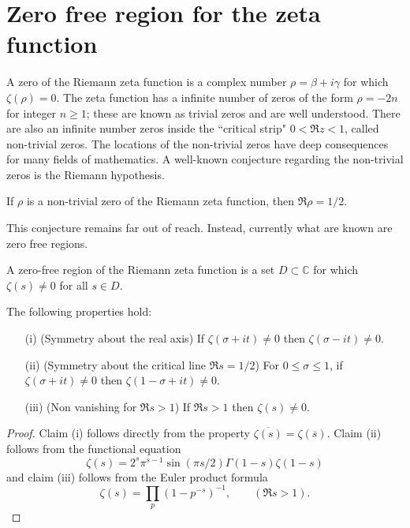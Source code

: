 \chapter{Zero free region for the zeta function}\label{zerofree-chapter}

\unintegrated 

A zero of the Riemann zeta function is a complex number $\rho = \beta + i\gamma$ for which $\zeta(\rho) = 0$. The zeta function has a infinite number of zeros of the form $\rho = -2n$ for integer $n \ge 1$; these are known as trivial zeros and are well understood. There are also an infinite number zeros inside the ``critical strip" $0 < \Re z < 1$, called non-trivial zeros. The locations of the non-trivial zeros have deep consequences for many fields of mathematics. A well-known conjecture regarding the non-trivial zeros is the Riemann hypothesis. 

\begin{conjecture}\label{rh}
If $\rho$ is a non-trivial zero of the Riemann zeta function, then $\Re \rho = 1/2$.
\end{conjecture}

This conjecture remains far out of reach. Instead, currently what are known are zero free regions.  

\begin{definition}\label{zeta-zero-free-def}
A zero-free region of the Riemann zeta function is a set $D \subset \mathbb{C}$ for which $\zeta(s) \ne 0$ for all $s \in D$. 
\end{definition}

\begin{lemma}\label{zero-free-basic-lem}
The following properties hold:
\begin{enumerate}
    \item[(i)] (Symmetry about the real axis) If $\zeta(\sigma + it) \ne 0$ then $\zeta(\sigma - it) \ne 0$.
    \item[(ii)] (Symmetry about the critical line $\Re s = 1/2$) For $0 \le \sigma \le 1$, if $\zeta(\sigma + it) \ne 0$ then $\zeta(1 - \sigma + it) \ne 0$.
    \item[(iii)] (Non vanishing for $\Re s > 1$) If $\Re s > 1$ then $\zeta(s) \ne 0$.
\end{enumerate}
\end{lemma}
\begin{proof}
Claim (i) follows directly from the property $\overline{\zeta(s)} = \zeta(\overline{s})$. Claim (ii) follows from the functional equation 
\[
\zeta(s) = 2^s \pi^{s - 1}\sin(\pi s/2) \Gamma(1 -s)\zeta(1-s)
\]
and claim (iii) follows from the Euler product formula
\[
\zeta(s) = \prod_{p}(1 - p^{-s})^{-1},\qquad (\Re s > 1).
\]
\end{proof}

